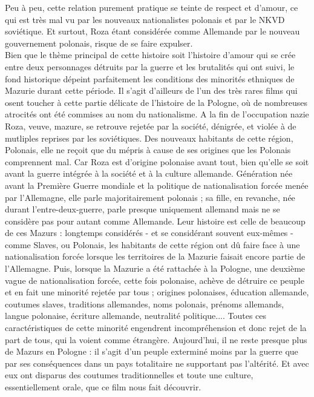 \documentclass[12pt]{amsart}
\begin{document}
\begin{multicols}{2}
 Peu à peu, cette relation purement pratique se teinte de respect et d'amour, ce qui est très mal vu par les nouveaux nationalistes polonais et par le NKVD soviétique. Et surtout, Roza étant considérée comme Allemande par le nouveau gouvernement polonais, risque de se faire expulser. \\
Bien que le thème principal de cette histoire soit l'histoire d'amour qui se crée entre deux personnages détruits par la guerre et les brutalités qui ont suivi, le fond historique dépeint parfaitement les conditions des minorités ethniques de Mazurie durant cette période. Il s'agit d'ailleurs de l'un des très rares films qui osent toucher à cette partie délicate de l'histoire de la Pologne, où de nombreuses atrocités ont été commises au nom du nationalisme. A la fin de l'occupation nazie Roza, veuve, mazure, se retrouve rejetée par la société, dénigrée, et violée à de mutliples reprises par les soviétiques. Des nouveaux habitants de cette région, Polonais, elle ne reçoit que du mépris à cause de ses origines que les Polonais comprennent mal. Car Roza est d'origine polonaise avant tout, bien qu'elle se soit avant la guerre intégrée à la société et à la culture allemande. Génération née avant la Première Guerre mondiale et la politique de nationalisation forcée menée par l'Allemagne, elle parle majoritairement polonais ; sa fille, en revanche, née durant l'entre-deux-guerre, parle presque uniquement allemand mais ne se considère pas pour autant comme Allemande. Leur histoire est celle de beaucoup de ces Mazurs : longtemps considérés - et se considérant souvent eux-mêmes - comme Slaves, ou Polonais, les habitants de cette région ont dû faire face à une nationalisation forcée lorsque les territoires de la Mazurie faisait encore partie de l'Allemagne. Puis, lorsque la Mazurie a été rattachée à la Pologne, une deuxième vague de nationalisation forcée, cette fois polonaise, achève de détruire ce peuple et en fait une minorité rejetée par tous ; origines polonaises, éducation allemande, coutumes slaves, traditions allemandes, noms polonais, prénoms allemands, langue polonaise, écriture allemande, neutralité politique.... Toutes ces caractéristiques de cette minorité engendrent incompréhension et donc rejet de la part de tous, qui la voient comme étrangère. Aujourd'hui, il ne reste presque plus de Mazurs en Pologne : il s'agit d'un peuple exterminé moins par la guerre que par ses conséquences dans un pays totalitaire ne supportant pas l'altérité. Et avec eux ont disparus des coutumes traditionnelles et toute une culture, essentiellement orale, que ce film nous fait découvrir.  
\clearpage


\end{multicols}
\end{document}
